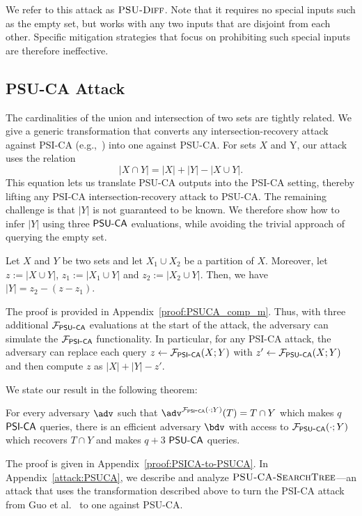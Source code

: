 We refer to this attack as ${\textsc{PSU\mbox{-}Diff}}$. 
Note that it requires no special inputs such as the empty set, but works with any two inputs that are disjoint from each other. 
Specific mitigation strategies that focus on prohibiting such special inputs are therefore ineffective.


\subsection{PSU-CA Attack}\label{sec:PSUCA_attack}
The cardinalities of the union and intersection of two sets are tightly related. We give a generic transformation that converts any intersection-recovery attack against PSI-CA (e.g.,~\cite{USENIX:GHLWJL22}) into one against PSU-CA. For sets $X$ and Y, our attack uses the relation
\[
  |X \cap Y| = |X| + |Y| - |X \cup Y|.
\]
This equation lets us translate PSU-CA outputs into the PSI-CA setting, thereby lifting any PSI-CA intersection-recovery attack to PSU-CA.
The remaining challenge is that $|Y|$ is not guaranteed to be known. We therefore show how to infer $|Y|$ using three $\mathsf{PSU\mbox{-}CA}$ evaluations, while avoiding the trivial approach of querying the empty set.

\begin{proposition}\label{prop:PSUCA_comp_m}
  Let $X$ and $Y$ be two sets and let $X_1\cup X_2$ be a partition of
  $X$. Moreover, let $z:= |X \cup Y|$, $z_1 := |X_1 \cup Y|$ and
  $z_2 := |X_2 \cup Y|$. Then, we have $|Y| = z_2 - (z - z_1)$.
\end{proposition}
 
The proof is provided in Appendix~\ref{proof:PSUCA_comp_m}. Thus, with three
additional $\mathcal{F}_{\mathsf{PSU\mbox{-}CA}}$ evaluations at the start of the attack, the
adversary can simulate the $\mathcal{F}_{\mathsf{PSI\mbox{-}CA}}$ functionality. In particular, for
any PSI-CA attack, the adversary can replace each query
$z\gets \mathcal{F}_{\mathsf{PSI\mbox{-}CA}}(X;Y)$ with $z'\gets \mathcal{F}_{\mathsf{PSU\mbox{-}CA}}(X;Y)$ and then compute
$z$ as $|X|+|Y|-z'$.

We state our result in the following theorem:
\begin{theorem}\label{thm:PSICA-to-PSUCA}
  For every adversary $\adv$ such that
  $\adv^{\calF_{\PSICA}(\cdot; Y)}(T) = T \cap Y$ which makes $q$ $\mathsf{PSI\mbox{-}CA}$
  queries, there is an efficient adversary $\bdv$ with access to
  $\mathcal{F}_{\mathsf{PSU\mbox{-}CA}}(\cdot; Y)$ which recovers $T \cap Y$ and makes $q + 3$
  $\mathsf{PSU\mbox{-}CA}$ queries.
\end{theorem}

The proof is given in Appendix~\ref{proof:PSICA-to-PSUCA}. In
Appendix~\ref{attack:PSUCA}, we describe and analyze
$\textsc{PSU\mbox{-}CA\mbox{-}SearchTree}$---an attack that uses the transformation described above to turn
the PSI-CA attack from Guo et al.~\cite{USENIX:GHLWJL22} to one against PSU-CA.